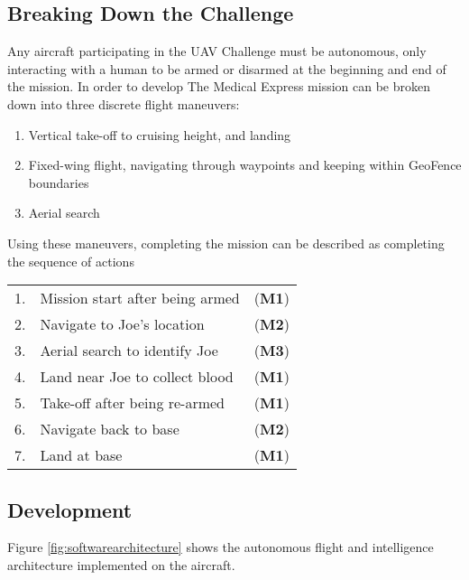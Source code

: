 \subsection{Breaking Down the Challenge}
\label{sec:flight}
Any aircraft participating in the UAV Challenge must be autonomous, only interacting with a human to be armed or disarmed at the beginning and end of the mission. In order to develop 
The Medical Express mission can be broken down into three discrete flight maneuvers:
\begin{enumerate}[label=\bfseries M\arabic*:] \itemsep-2pt
	\item Vertical take-off to cruising height, and landing
	\item Fixed-wing flight, navigating through waypoints and keeping within GeoFence boundaries
	\item Aerial search
\end{enumerate}

Using these maneuvers, completing the mission can be described as completing the sequence of actions\\
\begin{tabular}{r l l}
	1. & Mission start after being armed & (\textbf{M1}) \\ 
	2. & Navigate to Joe's location & (\textbf{M2}) \\ 
	3. & Aerial search to identify Joe & (\textbf{M3}) \\ 
	4. & Land near Joe to collect blood & (\textbf{M1}) \\ 
	5. & Take-off after being re-armed & (\textbf{M1}) \\ 
	6. & Navigate back to base & (\textbf{M2}) \\ 
	7. & Land at base & (\textbf{M1}) \\ 
\end{tabular} 

\subsection{Development}
Figure \ref{fig:softwarearchitecture} shows the autonomous flight and intelligence architecture implemented on the aircraft.



